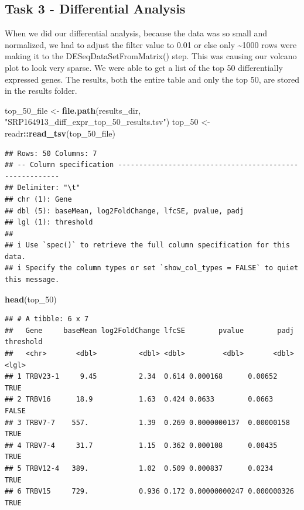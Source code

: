 \documentclass[
]{article}
\newenvironment{Shaded}{\begin{snugshade}}{\end{snugshade}}
\newcommand{\FunctionTok}[1]{\textcolor[rgb]{0.13,0.29,0.53}{\textbf{#1}}}
\newcommand{\NormalTok}[1]{#1}
\newcommand{\OtherTok}[1]{\textcolor[rgb]{0.56,0.35,0.01}{#1}}
\newcommand{\SpecialCharTok}[1]{\textcolor[rgb]{0.81,0.36,0.00}{\textbf{#1}}}
\newcommand{\StringTok}[1]{\textcolor[rgb]{0.31,0.60,0.02}{#1}}
\begin{document}
\subsection{Task 3 - Differential
Analysis}\label{task-3---differential-analysis}

When we did our differential analysis, because the data was so small and
normalized, we had to adjust the filter value to 0.01 or else only
\textasciitilde1000 rows were making it to the DESeqDataSetFromMatrix()
step. This was causing our volcano plot to look very sparse. We were
able to get a list of the top 50 differentially expressed genes. The
results, both the entire table and only the top 50, are stored in the
results folder.

\begin{Shaded}
\begin{Highlighting}[]
\NormalTok{top\_50\_file }\OtherTok{\textless{}{-}} \FunctionTok{file.path}\NormalTok{(results\_dir, }\StringTok{"SRP164913\_diff\_expr\_top\_50\_results.tsv"}\NormalTok{)}
\NormalTok{top\_50 }\OtherTok{\textless{}{-}}\NormalTok{ readr}\SpecialCharTok{::}\FunctionTok{read\_tsv}\NormalTok{(top\_50\_file)}
\end{Highlighting}
\end{Shaded}

\begin{verbatim}
## Rows: 50 Columns: 7
## -- Column specification --------------------------------------------------------
## Delimiter: "\t"
## chr (1): Gene
## dbl (5): baseMean, log2FoldChange, lfcSE, pvalue, padj
## lgl (1): threshold
## 
## i Use `spec()` to retrieve the full column specification for this data.
## i Specify the column types or set `show_col_types = FALSE` to quiet this message.
\end{verbatim}

\begin{Shaded}
\begin{Highlighting}[]
\FunctionTok{head}\NormalTok{(top\_50)}
\end{Highlighting}
\end{Shaded}

\begin{verbatim}
## # A tibble: 6 x 7
##   Gene     baseMean log2FoldChange lfcSE        pvalue        padj threshold
##   <chr>       <dbl>          <dbl> <dbl>         <dbl>       <dbl> <lgl>    
## 1 TRBV23-1     9.45          2.34  0.614 0.000168      0.00652     TRUE     
## 2 TRBV16      18.9           1.63  0.424 0.0633        0.0663      FALSE    
## 3 TRBV7-7    557.            1.39  0.269 0.0000000137  0.00000158  TRUE     
## 4 TRBV7-4     31.7           1.15  0.362 0.000108      0.00435     TRUE     
## 5 TRBV12-4   389.            1.02  0.509 0.000837      0.0234      TRUE     
## 6 TRBV15     729.            0.936 0.172 0.00000000247 0.000000326 TRUE
\end{verbatim}
\end{document}
